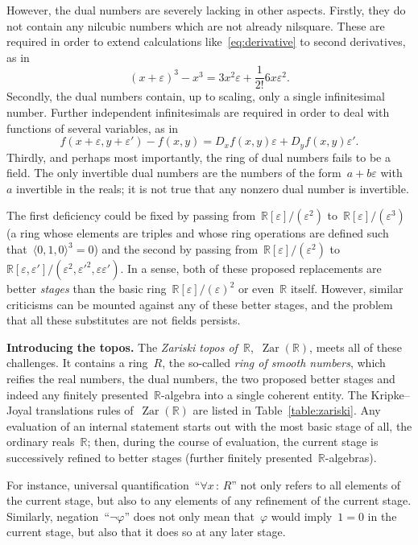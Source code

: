 \documentclass[oneside,reqno]{amsart}
\theoremstyle{definition}
\theoremstyle{plain}
\theoremstyle{remark}
\newcommand{\RR}{\mathbb{R}}
\DeclareMathOperator{\Zar}{Zar}
\renewcommand{\_}{\mathpunct{.}\,}
\newcommand{\?}{\,{:}\,}
\renewcommand{\paragraph}[1]{\noindent\textbf{#1.}}
\begin{document}
However, the dual numbers are severely lacking in other aspects. Firstly, they
do not contain any nilcubic numbers which are not already nilsquare. These are
required in order to extend calculations like~\eqref{eq:derivative} to second
derivatives, as in
\[ (x+\varepsilon)^3 - x^3 = 3x^2\varepsilon + \frac{1}{2!} 6x
\varepsilon^2. \]
Secondly, the dual numbers contain, up to scaling, only a single infinitesimal
number. Further independent infinitesimals are required in order to deal with
functions of several variables, as in
\[ f(x+\varepsilon,y+\varepsilon') - f(x,y) = D_xf(x,y)\varepsilon +
D_yf(x,y)\varepsilon'. \]
Thirdly, and perhaps most importantly, the ring of dual numbers fails to be a
field. The only invertible dual numbers are the numbers of the form~$a +
b\varepsilon$ with~$a$ invertible in the reals; it is not true that any nonzero
dual number is invertible.

The first deficiency could be fixed by passing
from~$\RR[\varepsilon]/(\varepsilon^2)$ to~$\RR[\varepsilon]/(\varepsilon^3)$
(a ring whose elements are triples and whose ring operations are defined such
that~$\langle0,1,0\rangle^3 = 0$) and the second by passing
from~$\RR[\varepsilon]/(\varepsilon^2)$
to~$\RR[\varepsilon,\varepsilon']/(\varepsilon^2,\varepsilon'^2,\varepsilon\varepsilon')$.
In a sense, both of these proposed replacements are better \emph{stages} than
the basic ring~$\RR[\varepsilon]/(\varepsilon)^2$ or even~$\RR$ itself. However,
similar criticisms can be mounted against any of these better stages, and the
problem that all these substitutes are not fields persists.

\bigskip
\paragraph{Introducing the topos}
The \emph{Zariski topos of~$\RR$},~$\Zar(\RR)$, meets all of these challenges. It
contains a ring~$R$, the so-called \emph{ring of smooth numbers}, which reifies
the real numbers, the dual numbers, the two proposed better stages and indeed
any finitely presented~$\RR$-algebra into a single coherent entity. The
Kripke--Joyal translations rules of~$\Zar(\RR)$ are listed in
Table~\ref{table:zariski}. Any evaluation of an internal statement starts out
with the most basic stage of all, the ordinary reals~$\RR$; then, during the
course of evaluation, the current stage is successively refined to better
stages (further finitely presented~$\RR$-algebras).

For instance, universal quantification~``$\forall x \? R$'' not only refers to
all elements of the current stage, but also to any elements of any refinement
of the current stage. Similarly, negation~``$\neg\varphi$'' does not only mean
that~$\varphi$ would imply~$1 = 0$ in the current stage, but also that it does
so at any later stage.
\end{document}
